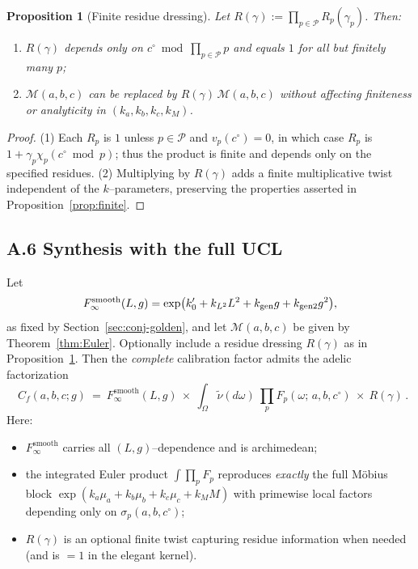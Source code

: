 \documentclass[12pt]{article}
\newtheorem{proposition}[theorem]{Proposition}
\numberwithin{equation}{section}
\begin{document}
\begin{proposition}[Finite residue dressing]\label{prop:residue}
Let $R(\gamma):=\prod_{p\in\mathcal{P}} R_p(\gamma_p)$. Then:
\begin{enumerate}
\item $R(\gamma)$ depends only on $c^\circ\bmod \prod_{p\in\mathcal{P}}p$ and equals $1$ for all but finitely many $p$;
\item $\mathcal{M}(a,b,c)$ can be replaced by $R(\gamma)\,\mathcal{M}(a,b,c)$ without affecting finiteness or analyticity in $(k_a,k_b,k_c,k_M)$.
\end{enumerate}
\end{proposition}

\begin{proof}
(1) Each $R_p$ is $1$ unless $p\in\mathcal{P}$ and $v_p(c^\circ)=0$, in which case $R_p$ is $1+\gamma_p\chi_p(c^\circ\bmod p)$; thus the product is finite and depends only on the specified residues. (2) Multiplying by $R(\gamma)$ adds a finite multiplicative twist independent of the $k$–parameters, preserving the properties asserted in Proposition~\ref{prop:finite}.
\end{proof}

\bigskip
\subsection*{A.6 \; Synthesis with the full UCL}

Let
\[
F_\infty^{\mathrm{smooth}}(L,g)=\exp\!\big(k_0'+k_{L^2}L^2+k_{\rm gen}g+k_{\rm gen2}g^2\big),
\]
as fixed by Section~\ref{sec:conj-golden}, and let $\mathcal{M}(a,b,c)$ be given by Theorem~\ref{thm:Euler}. Optionally include a residue dressing $R(\gamma)$ as in Proposition~\ref{prop:residue}. Then the \emph{complete} calibration factor admits the adelic factorization
\[
\boxed{\quad
C_f(a,b,c;g)\ =\ F_\infty^{\mathrm{smooth}}(L,g)\ \times\ 
\int_{\Omega}\tilde\nu(d\omega)\ \prod_{p} F_p(\omega;\,a,b,c^\circ)\ \times\ R(\gamma)\,.
\quad}
\]
Here:
\begin{itemize}
\item $F_\infty^{\mathrm{smooth}}$ carries all $(L,g)$–dependence and is archimedean;
\item the integrated Euler product $\int \prod_p F_p$ reproduces \emph{exactly} the full Möbius block $\exp(k_a\mu_a+k_b\mu_b+k_c\mu_c+k_M M)$ with primewise local factors depending only on $\sigma_p(a,b,c^\circ)$;
\item $R(\gamma)$ is an optional finite twist capturing residue information when needed (and is $=1$ in the elegant kernel).
\end{itemize}
\end{document}
